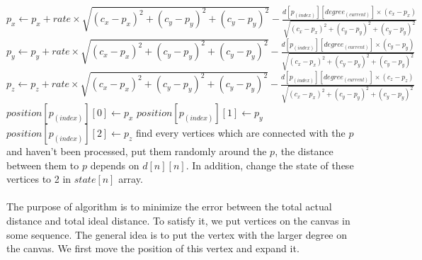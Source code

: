 \documentclass[runningheads]{llncs}
\begin{document}
\begin{algorithm}
\begin{algorithmic}[1]
                            \State $p_x \gets p_x + rate \times \sqrt{(c_x - p_x)^2+(c_y - p_y)^2+(c_y - p_y)^2} - \frac {d[p_(index)][degree_(current)]\times (c_x - p_x)} {\sqrt{(c_x - p_x)^2+(c_y - p_y)^2+(c_y - p_y)^2}}$
                            \State $p_y \gets p_y + rate \times \sqrt{(c_x - p_x)^2+(c_y - p_y)^2+(c_y - p_y)^2} - \frac {d[p_(index)][degree_(current)]\times (c_y - p_y)} {\sqrt{(c_x - p_x)^2+(c_y - p_y)^2+(c_y - p_y)^2}}$
                            \State $p_z \gets p_z + rate \times \sqrt{(c_x - p_x)^2+(c_y - p_y)^2+(c_y - p_y)^2} - \frac {d[p_(index)][degree_(current)]\times (c_z - p_z)} {\sqrt{(c_x - p_x)^2+(c_y - p_y)^2+(c_y - p_y)^2}}$
                        \EndFor
                    \EndFor
                    \State $position[p_(index)][0] \gets p_x$
                    \State $position[p_(index)][1] \gets p_y$
                    \State $position[p_(index)][2] \gets p_z$
                \EndFor
                \State find every vertices which are connected with the $p$ and haven't been processed, put them randomly around the $p$, the distance between them to $p$ depends on $d[n][n]$. In addition, change the state of these vertices to 2 in $state[n]$ array. 
            \EndFunction
            
        \end{algorithmic}
    \end{algorithm}
\paragraph{}
The purpose of algorithm is to minimize the error between the total actual distance and total ideal distance. To satisfy it, we put vertices on the canvas in some sequence. The general idea is to put the vertex with the larger degree on the canvas. We first move the position of this vertex and expand it.
\end{document}
